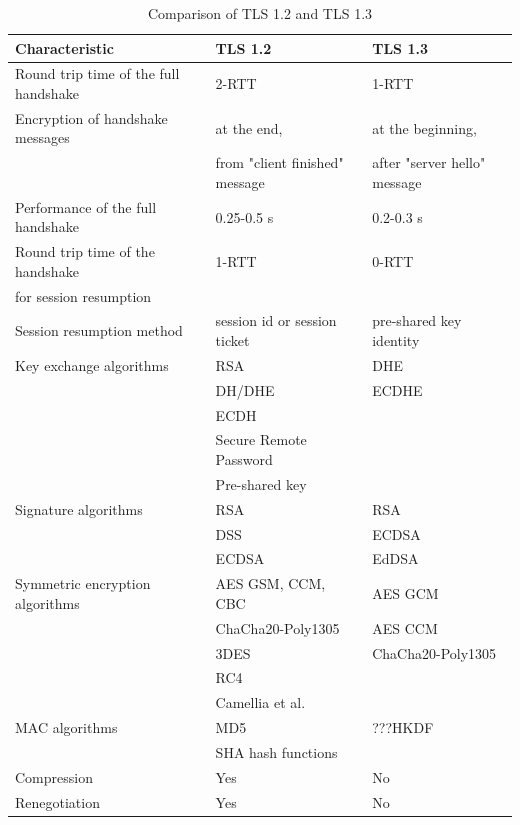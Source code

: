 \begin{table}[H]
	\centering
		\begin{tabular}{lll} \toprule
			\textbf{Characteristic} & \textbf{TLS 1.2} & \textbf{TLS 1.3} \\ \midrule
			Round trip time of the full handshake & 2-RTT & 1-RTT \\ \midrule
			Encryption of handshake messages & at the end, & at the beginning, \\ 
			& from "client finished" message & after "server hello" message \\ \midrule
			Performance of the full handshake & 0.25-0.5 s & 0.2-0.3 s\\ \midrule
			Round trip time of the handshake & 1-RTT & 0-RTT \\ 
			for session resumption \\ \midrule
			Session resumption method & session id or session ticket & pre-shared key identity \\ \midrule
			Key exchange algorithms & RSA & DHE\\ 
			& DH/DHE & ECDHE\\
			& ECDH \\
			& Secure Remote Password \\
			& Pre-shared key \\ \midrule
			Signature algorithms & RSA & RSA\\
			& DSS & ECDSA\\
			& ECDSA & EdDSA \\ \midrule
			Symmetric encryption algorithms & AES GSM, CCM, CBC  & AES GCM\\
			& ChaCha20-Poly1305 & AES CCM \\
			& 3DES & ChaCha20-Poly1305 \\
			& RC4 \\
			& Camellia et al.\\ \midrule
			MAC algorithms & MD5 & ???HKDF\\
			& SHA hash functions \\ \midrule
			Compression & Yes & No \\ \midrule
			Renegotiation & Yes & No \\ \midrule
			

		\end{tabular}
	\caption{Comparison of TLS 1.2 and TLS 1.3}
	\label{tab:comparison}
\end{table}


